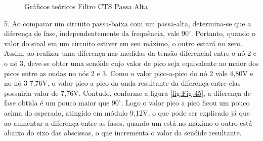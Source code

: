 \documentclass[a4paper]{article} %
\begin{document}
\begin{figure}[h!]
\begin{centering}
\par\end{centering}
\caption{Gráficos teóricos Filtro CTS Passa Alta \label{fig:teo_high}}
\end{figure}

\newpage
5. Ao comparar um circuito passa-baixa com um passa-alta, determina-se que a diferença de fase, independentemente da frequência, vale $90^{\circ}$.
Portanto, quando o valor do sinal em um circuito estiver em seu máximo, o outro estará no zero. Assim, ao realizar uma diferença nas medidas da tensão diferencial entre o nó 2 e o nó 3, deve-se obter uma senóide cujo valor de pico seja equivalente ao maior dos picos entre as ondas no nós 2 e 3. Como o valor pico-a-pico do nó 2 vale 4,80V e no nó 3 7,76V, o valor pico a pico da onda resultante da diferença entre elas possuiria valor de 7,76V.
Contudo, conforme a figura \ref{fig:Fig-45}, a diferença de fase obtida é um pouco maior que $90^{\circ}$. Logo o valor pico a pico ficou um pouco acima do esperado, atingido em módulo 9,12V, o que pode ser explicado já que ao aumentar a diferença entre as fases, quando um está no máximo o outro está  abaixo do eixo das abscissas, o que incrementa o valor da senóide resultante.        
\end{document}

